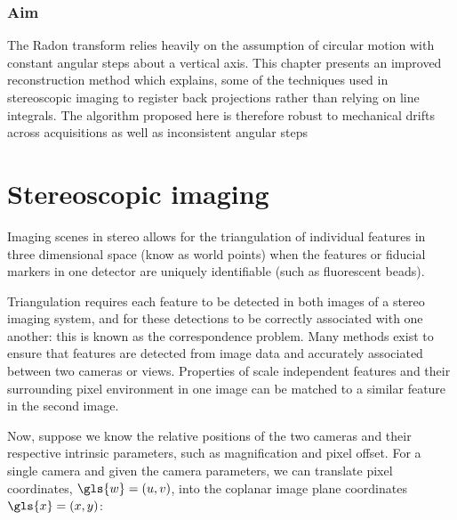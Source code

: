 \subsubsection{Aim}

The \gls{Radon transform} relies heavily on the assumption of circular motion with constant angular steps about a vertical axis.
This chapter presents an improved reconstruction method which explains, some of the techniques used in stereoscopic imaging to register back projections rather than relying on line integrals.
The algorithm proposed here is therefore robust to mechanical drifts across acquisitions as well as inconsistent angular steps

\section{Stereoscopic imaging}





Imaging scenes in stereo allows for the triangulation of individual features in three dimensional space (know as \gls{world point}s) when the features or fiducial markers in one detector are uniquely identifiable (such as fluorescent beads).

Triangulation requires each feature
to be detected in both images of a stereo imaging system, and for these detections to be correctly associated with one another:
this is known as the correspondence problem.
Many methods exist to ensure that features are %
detected from image data and accurately associated
between two cameras or views. %
Properties of scale independent features and their surrounding pixel environment in one image can be matched to a similar feature in the second image.

Now, suppose we know the relative positions of the two cameras and their respective intrinsic parameters, such as magnification and pixel offset.
For a single camera and given the camera parameters, we can translate pixel coordinates, \(\gls{w} = (u, v)\), into the coplanar \gls{image plane} coordinates \(\gls{x}=(x, y)\):

